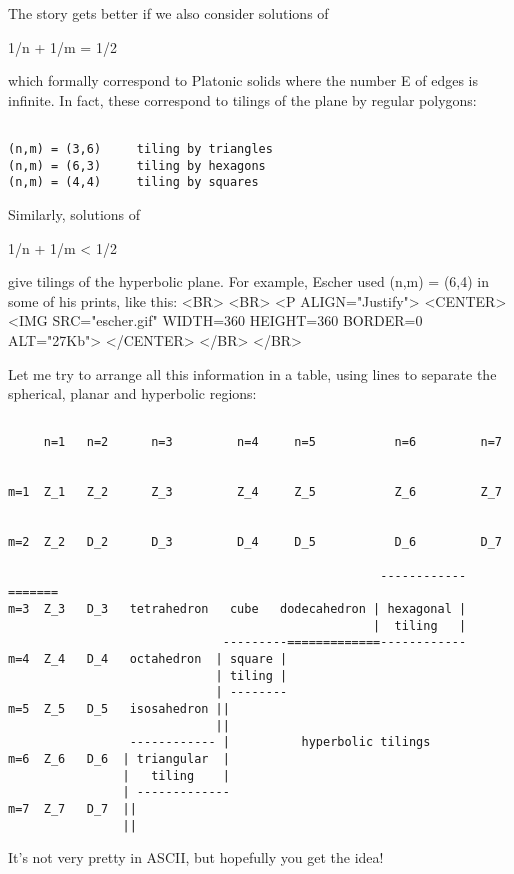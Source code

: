 The story gets better if we also consider solutions of 

1/n + 1/m = 1/2

which formally correspond to Platonic solids where the number
E of edges is infinite.  In fact, these correspond to tilings 
of the plane by regular polygons:


\begin{verbatim}

(n,m) = (3,6)     tiling by triangles
(n,m) = (6,3)     tiling by hexagons
(n,m) = (4,4)     tiling by squares
\end{verbatim}
    
Similarly, solutions of

1/n + 1/m < 1/2 

give tilings of the hyperbolic plane.  For example, Escher used
(n,m) = (6,4) in some of his prints, like this:
<BR>
<BR>
<P ALIGN="Justify">
<CENTER>
<IMG SRC="escher.gif" WIDTH=360 HEIGHT=360 BORDER=0 ALT="27Kb">
</CENTER>
</BR>
</BR>

Let me try to arrange all this information in a table, using lines
to separate the spherical, planar and hyperbolic regions:



\begin{verbatim}

     n=1   n=2      n=3         n=4     n=5           n=6         n=7

     
m=1  Z_1   Z_2      Z_3         Z_4     Z_5           Z_6         Z_7

                                                    
m=2  Z_2   D_2      D_3         D_4     D_5           D_6         D_7

                                                    ------------=======
m=3  Z_3   D_3   tetrahedron   cube   dodecahedron | hexagonal |   
                                                   |  tiling   |
                              ---------=============------------
m=4  Z_4   D_4   octahedron  | square |
                             | tiling |
                             | --------
m=5  Z_5   D_5   isosahedron ||
                             ||
                 ------------ |          hyperbolic tilings
m=6  Z_6   D_6  | triangular  |                
                |   tiling    |
                | -------------    
m=7  Z_7   D_7  ||
                ||
\end{verbatim}
    
It's not very pretty in ASCII, but hopefully you get the idea!  


